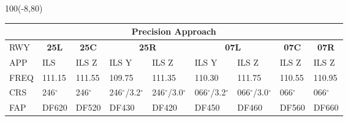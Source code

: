 \documentclass[10pt,landscape,a4paper]{article}
\begin{document}
\begin{textblock}{100}(-8,80)
  \begin{table}[]
    \begin{tabular}{|l|l|l|l|l|l|l|l|l|}
      \multicolumn{9}{c}{\textbf{Precision Approach}}                                                                                                                                                                                                          \\ \hline
      RWY  & \multicolumn{1}{c|}{\textbf{25L}} & \multicolumn{1}{c|}{\textbf{25C}} & \multicolumn{2}{c|}{\textbf{25R}} & \multicolumn{2}{c|}{\textbf{07L}} & \multicolumn{1}{c|}{\textbf{07C}} & \multicolumn{1}{c|}{\textbf{07R}}                             \\ \hline
      APP  & ILS                               & ILS Z                             & ILS Y                             & ILS Z                             & ILS Y                             & ILS Z                             & ILS Z       & ILS Z       \\
      FREQ & 111.15                            & 111.55                            & 109.75                            & 111.35                            & 110.30                            & 111.75                            & 110.55      & 110.95      \\
      CRS  & 246$^\circ$                       & 246$^\circ$                       & 246$^\circ$/3.2$^\circ$           & 246$^\circ$/3.0$^\circ$           & 066$^\circ$/3.2$^\circ$           & 066$^\circ$/3.0$^\circ$           & 066$^\circ$ & 066$^\circ$ \\
      FAP  & DF620                             & DF520                             & DF430                             & DF420                             & DF450                             & DF460                             & DF560       & DF660       \\ \hline
    \end{tabular}
  \end{table}
\end{textblock}
\end{document}
